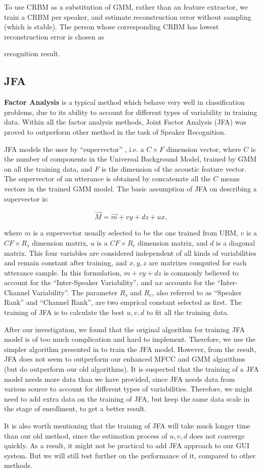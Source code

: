 To use CRBM as a substitution of GMM, rather than
an feature extractor, we train a CRBM per speaker,
and estimate reconstruction error without sampling (which is stable).
The person whose corresponding CRBM has lowest reconstruction error is chosen as

recognition result.

\subsection{JFA}

\textbf{Factor Analysis} is a typical method which behave
very well in classification problems, due to its ability to
account for different types of variability in training data.
Within all the factor analysis methods,
Joint Factor Analysis (JFA)\cite{jfa2,jfa-se} was proved to outperform other method
in the task of Speaker Recognition.

JFA models the user by ``supervector'' , i.e. a $C\times F $ dimension vector, where $C$ is
the number of components in the Universal Background Model, trained by GMM on all the training data,
and $ F$ is the dimension of the acoustic feature vector. The supervector of an utterance is obtained by concatenate
all the $C $ means vectors in the trained GMM model. The basic assumption of JFA on describing a supervector is:

\[ \vec{M} = \vec{ m } + vy + dz + ux, \]

where $m$ is a supervector usually selected to be the one trained from UBM, $v$ is a $ CF \times R_s$ dimension matrix,
$ u$ is a $ CF \times R_c$ dimension matrix, and $d$ is a diagonal matrix.
This four variables are considered independent of all kinds of variabilities and remain constant after training, and
$x, y, z $ are matrixes computed for each utterance sample.
In this formulation, $ m + vy + dz$ is commonly believed to account for the ``Inter-Speaker Variability'', and $ux $ accounts
for the ``Inter-Channel Variability''.
The parameter $ R_s $ and $ R_c$, also referred to as ``Speaker Rank'' and ``Channel Rank'', are two emprical constant selected as first.
The training of JFA is to calculate the best $ u, v, d$ to fit all the training data.

After our investigation, we found that the original algorithm \cite{jfa-se} for training JFA model is of
too much complication and hard to implement.
Therefore, we use the simpler algorithm presented in \cite{jfa-study}
to train the JFA model. However, from the result, JFA does not seem to outperform our enhanced MFCC and GMM algorithms
(but do outperform our old algorithms). It is suspected that the training of a JFA model needs more data than
we have provided, since JFA needs data from various source to account for different types of variabilities.
Therefore, we might need to add extra data on the training of JFA, but keep the same data scale in the stage of enrollment,
to get a better result.

It is also worth mentioning that the training of JFA will take much longer time than our old method,
since the estimation process of $ u, v, d$ does not converge quickly. As a result, it might not be practical to add
JFA approach to our GUI system. But we will still test further on the performance of it, compared to other methods.
